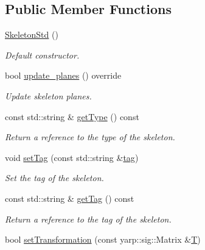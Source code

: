 \subsection*{Public Member Functions}
\begin{DoxyCompactItemize}
\item 
\mbox{\label{classassistive__rehab_1_1SkeletonStd_ae383ac2b515aa5774b010afc22856360}} 
\mbox{\hyperlink{classassistive__rehab_1_1SkeletonStd_ae383ac2b515aa5774b010afc22856360}{Skeleton\+Std}} ()
\begin{DoxyCompactList}\small\item\em Default constructor. \end{DoxyCompactList}\item 
bool \mbox{\hyperlink{classassistive__rehab_1_1SkeletonStd_a5769bc6fd407118c866b57b869d672ca}{update\+\_\+planes}} () override
\begin{DoxyCompactList}\small\item\em Update skeleton planes. \end{DoxyCompactList}\item 
const std\+::string \& \mbox{\hyperlink{classassistive__rehab_1_1Skeleton_a4efc4844bd2b185f1080ee52ab69cb04}{get\+Type}} () const
\begin{DoxyCompactList}\small\item\em Return a reference to the type of the skeleton. \end{DoxyCompactList}\item 
void \mbox{\hyperlink{classassistive__rehab_1_1Skeleton_ae1c830e3d9a0ba692e5ae297caa52a82}{set\+Tag}} (const std\+::string \&\mbox{\hyperlink{classassistive__rehab_1_1Skeleton_a3d1ce5280300e012826948dc4383c2cb}{tag}})
\begin{DoxyCompactList}\small\item\em Set the tag of the skeleton. \end{DoxyCompactList}\item 
const std\+::string \& \mbox{\hyperlink{classassistive__rehab_1_1Skeleton_a185654045d5e43b3853cdb8fdd676da6}{get\+Tag}} () const
\begin{DoxyCompactList}\small\item\em Return a reference to the tag of the skeleton. \end{DoxyCompactList}\item 
bool \mbox{\hyperlink{classassistive__rehab_1_1Skeleton_a3486cbd7f59e75c1d9ef26cbc05bb72f}{set\+Transformation}} (const yarp\+::sig\+::\+Matrix \&\mbox{\hyperlink{classassistive__rehab_1_1Skeleton_a358a1c5eb23a562f8558ff8d43583ef7}{T}})

\end{DoxyCompactItemize}
